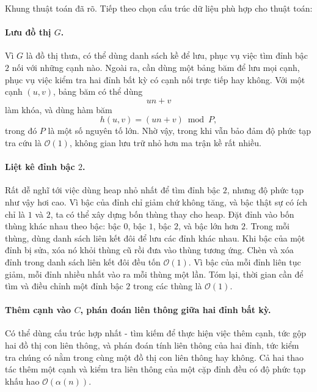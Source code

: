\documentclass[11pt]{article}
\newcommand{\Oh}{\mathcal{O}}
\begin{document}
Khung thuật toán đã rõ. Tiếp theo chọn cấu trúc dữ liệu phù hợp cho thuật toán:

\paragraph{Lưu đồ thị \(G\).}
Vì \(G\) là đồ thị thưa, có thể dùng danh sách kề để lưu, phục vụ việc tìm
đỉnh bậc \(2\) nối với những cạnh nào. Ngoài ra, cần dùng một bảng băm để lưu
mọi cạnh, phục vụ việc kiểm tra hai đỉnh bất kỳ có cạnh nối trực tiếp hay
không. Với một cạnh \((u,v)\), bảng băm có thể dùng
\[
  u n+v
\]
làm khóa, và dùng hàm băm
\[
  h(u,v)=(un+v)\bmod P,
\]
trong đó \(P\) là một số nguyên tố lớn. Nhờ vậy, trong khi vẫn bảo đảm độ phức
tạp tra cứu là \(\Oh(1)\), không gian lưu trữ nhỏ hơn ma trận kề rất nhiều.

\paragraph{Liệt kê đỉnh bậc \(2\).}
Rất dễ nghĩ tới việc dùng heap nhỏ nhất để tìm đỉnh bậc \(2\), nhưng độ phức
tạp như vậy hơi cao. Vì bậc của đỉnh chỉ giảm chứ không tăng, và bậc thật sự
có ích chỉ là \(1\) và \(2\), ta có thể xây dựng bốn thùng thay cho heap. Đặt
đỉnh vào bốn thùng khác nhau theo bậc: bậc \(0\), bậc \(1\), bậc \(2\), và bậc
lớn hơn \(2\). Trong mỗi thùng, dùng danh sách liên kết đôi để lưu các đỉnh
khác nhau. Khi bậc của một đỉnh bị sửa, xóa nó khỏi thùng cũ rồi đưa vào thùng
tương ứng. Chèn và xóa đỉnh trong danh sách liên kết đôi đều tốn \(\Oh(1)\).
Vì bậc của mỗi đỉnh liên tục giảm, mỗi đỉnh nhiều nhất vào ra mỗi thùng một
lần. Tóm lại, thời gian cần để tìm và điều chỉnh một đỉnh bậc \(2\) trong các
thùng là \(\Oh(1)\).

\paragraph{Thêm cạnh vào \(C\), phán đoán liên thông giữa hai đỉnh bất kỳ.}
Có thể dùng cấu trúc hợp nhất - tìm kiếm để thực hiện việc thêm cạnh, tức gộp
hai đồ thị con liên thông, và phán đoán tính liên thông của hai đỉnh, tức kiểm
tra chúng có nằm trong cùng một đồ thị con liên thông hay không. Cả hai thao
tác thêm một cạnh và kiểm tra liên thông của một cặp đỉnh đều có độ phức tạp
khấu hao \(\Oh(\alpha(n))\).
\end{document}
